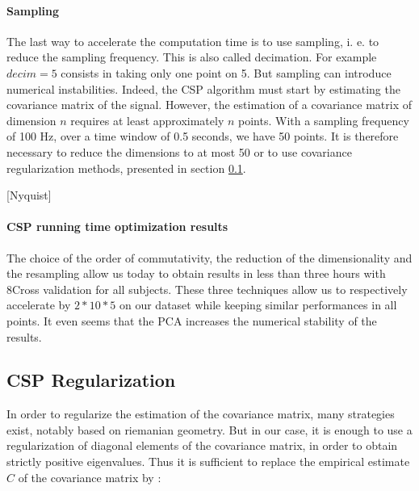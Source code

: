 \paragraph{Sampling}

The last way to accelerate the computation time is to use sampling, i. e. to reduce the sampling frequency. This is also called decimation. For example $decim = 5$ consists in taking only one point on 5. But sampling can introduce numerical instabilities. Indeed, the CSP algorithm must start by estimating the covariance matrix of the signal. However, the estimation of a covariance matrix of dimension $n$ requires at least approximately $n$ points. With a sampling frequency of 100 Hz, over a time window of 0.5 seconds, we have 50 points. It is therefore necessary to reduce the dimensions to at most 50 or to use covariance regularization methods, presented in section \ref{CSP_regularization}.

[Nyquist]

\paragraph{CSP running time optimization results}

The choice of the order of commutativity, the reduction of the dimensionality and the resampling allow us today to obtain results in less than three hours with 8Cross validation for all subjects. These three techniques allow us to respectively accelerate by $2*10*5$ on our dataset while keeping similar performances in all points. It even seems that the PCA increases the numerical stability of the results.




\subsection{CSP Regularization}
\label{CSP_regularization}
In order to regularize the estimation of the covariance matrix, many strategies exist, notably based on riemanian geometry. But in our case, it is enough to use a regularization of diagonal elements of the covariance matrix, in order to obtain strictly positive eigenvalues. Thus it is sufficient to replace the empirical estimate $C$ of the covariance matrix by :

